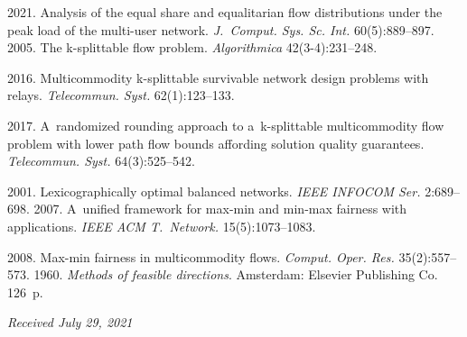   \begin{multicols}{2}

\renewcommand{\bibname}{\protect\rmfamily References}

{\small\frenchspacing
 {%
 \begin{thebibliography}{9}

 2021. Analysis of the equal share and equalitarian 
flow distributions under the  peak load of the multi-user network. \textit{J.~Comput. Sys. Sc. Int.}  
60(5):889--897.
 2005. The k-splittable flow problem. 
\textit{Algorithmica}
 42(3-4):231--248.
 
 2016. Multicommodity k-splittable survivable network 
design problems with relays. \textit{Telecommun. Syst.} 62(1):123--133.

 2017. A~randomized rounding approach to a~\mbox{k-splittable} multicommodity flow 
problem with lower path flow bounds affording solution quality guarantees. \textit{Telecommun. 
Syst.}   64(3):525--542.
{ %

}
 2001. Lexicographically 
optimal balanced networks. \textit{IEEE INFOCOM Ser.} 2:689--698. 
 2007. A~unified framework for max-min and min-max 
fairness with applications. \textit{IEEE ACM T.~Network.} 15(5):1073--1083.
{

} 
 2008. Max-min fairness in 
multicommodity flows. \textit{Comput. Oper. Res.}  35(2):557--573.
 1960. \textit{Methods of feasible directions}. Amsterdam: Elsevier Publishing 
Co. 126~p.
\end{thebibliography}

 }
 }

\end{multicols}

\vspace*{-3pt}

\hfill{\small\textit{Received July 29, 2021}}





